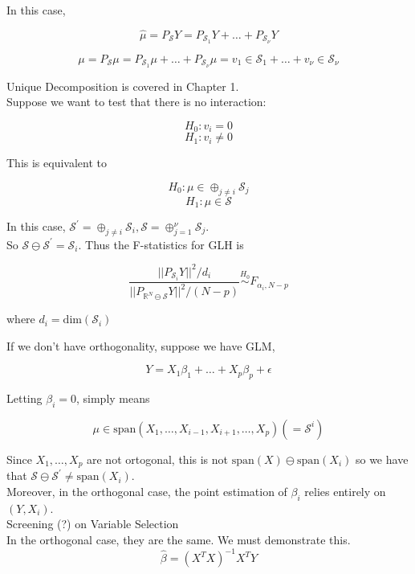 \documentclass[11pt,fleqn]{book} %
\begin{document}
In this case, 

	$$\hat{\mu} = P_{\mathcal{S}} Y = P_{\mathcal{S}_1} Y + \dots + P_{\mathcal{S}_\nu} Y$$

	$$ \mu = P_{\mathcal{S}} \mu = P_{\mathcal{S}_1} \mu + \dots + P_{\mathcal{S}_\nu} \mu = v_1 \in \mathcal{S}_1 + \dots + v_\nu \in \mathcal{S}_\nu $$


Unique Decomposition is covered in Chapter 1. \\

Suppose we want to test that there is no interaction: 

		$$H_0: v_i = 0 $$
		$$H_1: v_i \neq 0 $$

This is equivalent to 

		$$H_0: \mu \in \oplus_{j \neq i} \mathcal{S}_j$$
		$$H_1: \mu \in \mathcal{S} $$

In this case,  $ \mathcal{S}^\prime = \oplus_{j \neq i} \mathcal{S}_i, \mathcal{S} = \oplus^\nu_{j = 1} \mathcal{S}_j$. \\

So $\mathcal{S} \ominus \mathcal{S}^\prime = \mathcal{S}_i.$ Thus the F-statistics for GLH is

		$$\frac{||P_{\mathcal{S}_i} Y ||^2/ d_i}{|| P_{\mathbb{R}^N \ominus \mathcal{S}} Y ||^2 / (N-p)}  \stackrel{H_0}{\sim} F_{\alpha_i, N-p}$$

where $d_i = \text{dim}(\mathcal{S}_i)$

If we don't have orthogonality, suppose we have GLM, 

		$$Y = X_1 \beta_1 + \dots + X_p \beta_p + \epsilon $$

Letting $\beta_i = 0$, simply means

		$$\mu \in \text{span}(X_1, \dots, X_{i-1}, X_{i + 1}, \dots, X_p ) (= \mathcal{S}^i) $$


Since $X_1, \dots, X_p$ are not ortogonal, this is not $\text{span}(X) \ominus \text{span}(X_i)$ so we have that $\mathcal{S} \ominus \mathcal{S}^\prime \neq \text{span}(X_i)$. \\

Moreover, in the orthogonal case, the point estimation of $\beta_i$ relies entirely on $(Y, X_i)$. \\

Screening (?) on Variable Selection\\

In the orthogonal case, they are the same. We must demonstrate this. \\

		$$\hat{\beta } = (X^T X)^{-1} X^T Y $$
\end{document}
